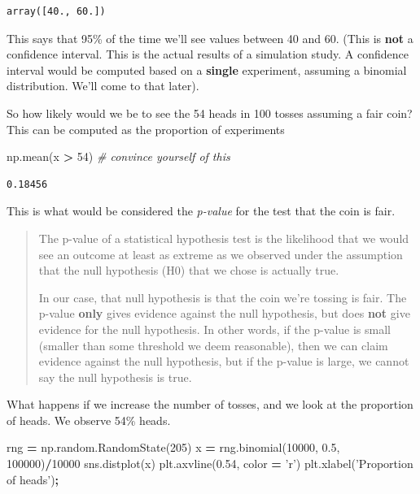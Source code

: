 \documentclass[
  letterpaper,
]{scrbook}
\newenvironment{Shaded}{\begin{snugshade}}{\end{snugshade}}
\newcommand{\CommentTok}[1]{\textcolor[rgb]{0.56,0.35,0.01}{\textit{#1}}}
\newcommand{\DecValTok}[1]{\textcolor[rgb]{0.00,0.00,0.81}{#1}}
\newcommand{\FloatTok}[1]{\textcolor[rgb]{0.00,0.00,0.81}{#1}}
\newcommand{\NormalTok}[1]{#1}
\newcommand{\OperatorTok}[1]{\textcolor[rgb]{0.81,0.36,0.00}{\textbf{#1}}}
\newcommand{\StringTok}[1]{\textcolor[rgb]{0.31,0.60,0.02}{#1}}
\begin{document}
\begin{verbatim}
array([40., 60.])
\end{verbatim}

This says that 95\% of the time we'll see values between 40 and 60. (This is \textbf{not} a confidence interval. This is the actual results of a simulation study. A confidence interval would be computed based on a \textbf{single} experiment, assuming a binomial distribution. We'll come to that later).

So how likely would we be to see the 54 heads in 100 tosses assuming a fair coin? This can be computed as the proportion of experiments

\begin{Shaded}
\begin{Highlighting}[]
\NormalTok{np.mean(x }\OperatorTok{>} \DecValTok{54}\NormalTok{) }\CommentTok{# convince yourself of this}
\end{Highlighting}
\end{Shaded}

\begin{verbatim}
0.18456
\end{verbatim}

This is what would be considered the \emph{p-value} for the test that the coin is fair.

\begin{quote}
The p-value of a statistical hypothesis test is the likelihood that we would see an outcome at least as extreme as we observed under the assumption that the null hypothesis (H0) that we chose is actually true.

In our case, that null hypothesis is that the coin we're tossing is fair. The p-value \textbf{only} gives evidence against the null hypothesis, but does \textbf{not} give evidence for the null hypothesis. In other words, if the p-value is small (smaller than some threshold we deem reasonable), then we can claim evidence against the null hypothesis, but if the p-value is large, we cannot say the null hypothesis is true.
\end{quote}

What happens if we increase the number of tosses, and we look at the proportion of heads. We observe 54\% heads.

\begin{Shaded}
\begin{Highlighting}[]
\NormalTok{rng }\OperatorTok{=}\NormalTok{ np.random.RandomState(}\DecValTok{205}\NormalTok{)}
\NormalTok{x }\OperatorTok{=}\NormalTok{ rng.binomial(}\DecValTok{10000}\NormalTok{, }\FloatTok{0.5}\NormalTok{, }\DecValTok{100000}\NormalTok{)}\OperatorTok{/}\DecValTok{10000}
\NormalTok{sns.distplot(x)}
\NormalTok{plt.axvline(}\FloatTok{0.54}\NormalTok{, color }\OperatorTok{=} \StringTok{'r'}\NormalTok{)}
\NormalTok{plt.xlabel(}\StringTok{'Proportion of heads'}\NormalTok{)}\OperatorTok{;}
\end{Highlighting}
\end{Shaded}
\end{document}
